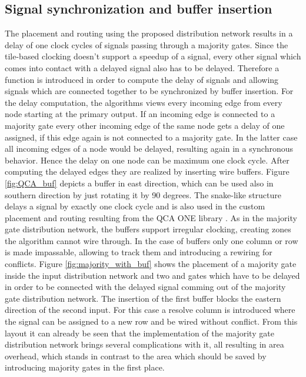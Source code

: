 \subsection{Signal synchronization and buffer insertion}
The placement and routing using the proposed distribution network results in a delay of one clock cycles of signals passing through a majority gates. Since the tile-based clocking doesn't support a speedup of a signal, every other signal which comes into contact with a delayed signal also has to be delayed. Therefore a function is introduced in order to compute the delay of signals and allowing signals which are connected together to be synchronized by buffer insertion. For the delay computation, the algorithms views every incoming edge from every node starting at the primary output. If an incoming edge is connected to a majority gate every other incoming edge of the same node gets a delay of one assigned, if this edge again is not connected to a majority gate. In the latter case all incoming edges of a node would be delayed, resulting again in a synchronous behavior. Hence the delay on one node can be maximum one clock cycle. After computing the delayed edges they are realized by inserting wire buffers. Figure \ref{fig:QCA_buf} depicts a buffer in east direction, which can be used also in southern direction by just rotating it by 90 degrees. The snake-like structure delays a signal by exactly one clock cycle and is also used in the custom placement and routing resulting from the QCA ONE library \cite{QCA_scl}. As in the majority gate distribution network, the buffers support irregular clocking, creating zones the algorithm cannot wire through. In the case of buffers only one column or row is made impassable, allowing to track them and introducing a rewiring for conflicts. Figure \ref{fig:majority_with_buf} shows the placement of a majority gate inside the input distribution network and two and gates which have to be delayed in order to be connected with the delayed signal comming out of the majority gate distribution network. The insertion of the first buffer blocks the eastern direction of the second input. For this case a resolve column is introduced where the signal can be assigned to a new row and be wired without conflict. From this layout it can already be seen that the implementation of the majority gate distribution network brings several complications with it, all resulting in area overhead, which stands in contrast to the area which should be saved by introducing majority gates in the first place.

